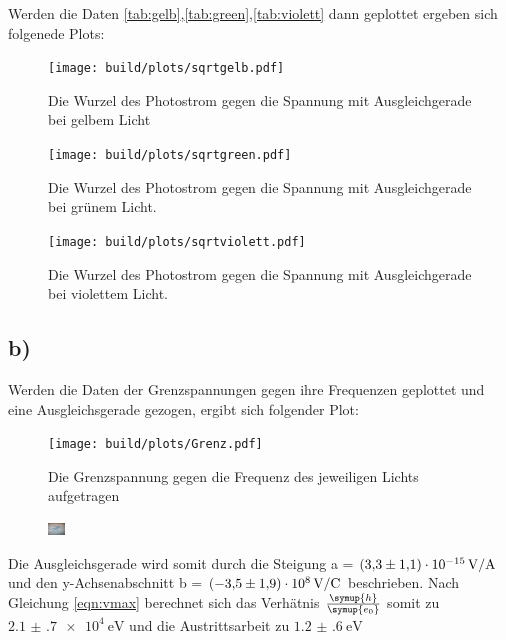     \noindent
    Werden die Daten \ref{tab:gelb},\ref{tab:green},\ref{tab:violett} dann geplottet ergeben sich folgenede Plots:
    \noindent

    \begin{figure}[H]
        \centering
        \texttt{[image: build/plots/sqrtgelb.pdf]}
        \caption{Die Wurzel des Photostrom gegen die Spannung mit Ausgleichgerade bei gelbem Licht}
        \label{img:sqrtgelb}
    \end{figure}

    \begin{figure}[H]
        \centering
        \texttt{[image: build/plots/sqrtgreen.pdf]}
        \caption{Die Wurzel des Photostrom gegen die Spannung mit Ausgleichgerade bei grünem Licht.}
        \label{img:sqrtgruen}
    \end{figure}

    \begin{figure}[H]
        \centering
        \texttt{[image: build/plots/sqrtviolett.pdf]}
        \caption{Die Wurzel des Photostrom gegen die Spannung mit Ausgleichgerade bei violettem Licht.}
        \label{img:sqrtviolett}
    \end{figure}

\subsection{b)}

    \noindent
    Werden die Daten der Grenzspannungen gegen ihre Frequenzen geplottet und eine Ausgleichsgerade gezogen, ergibt sich folgender Plot:
    \noindent

    \begin{figure}[H]
        \centering
        \texttt{[image: build/plots/Grenz.pdf]}
        \caption{Die Grenzspannung gegen die Frequenz des jeweiligen Lichts aufgetragen}
        \label{img:gegen}
    \end{figure}

    \begin{figure}[H]
        \centering
        \includegraphics[width=0.04\textwidth]{latex/images/meme.PNG}
    \end{figure}

    \noindent
    Die Ausgleichsgerade wird somit durch die Steigung a = $\SI{3.3 (11)e-15}{\volt\per\ampere}$ und den y-Achsenabschnitt 
    b = $\SI{-3.5 (19)e8}{\volt\per\coulomb}$ beschrieben.
    Nach Gleichung \ref{eqn:vmax} berechnet sich das Verhätnis $\frac{\symup{h}}{\symup{e_0}}$ somit zu $\SI{2.1(7)e4}{\electronvolt}$ und die 
    Austrittsarbeit zu $\SI{1.2(6)}{\electronvolt}$
    \noindent

